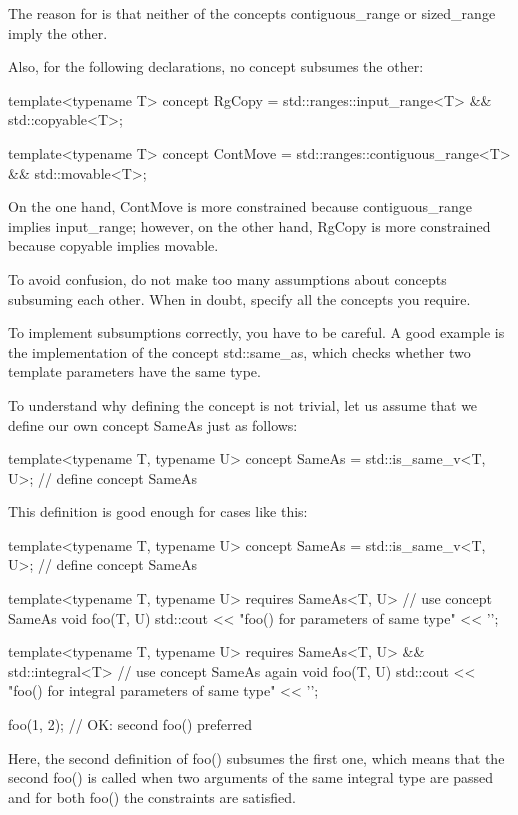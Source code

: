 The reason for is that neither of the concepts contiguous\_range or sized\_range imply the other.

Also, for the following declarations, no concept subsumes the other:

\begin{cpp}
template<typename T>
concept RgCopy = std::ranges::input_range<T> && std::copyable<T>;

template<typename T>
concept ContMove = std::ranges::contiguous_range<T> && std::movable<T>;
\end{cpp}

On the one hand, ContMove is more constrained because contiguous\_range implies input\_range; however, on the other hand, RgCopy is more constrained because copyable implies movable.

To avoid confusion, do not make too many assumptions about concepts subsuming each other. When in doubt, specify all the concepts you require.


To implement subsumptions correctly, you have to be careful. A good example is the implementation of the concept std::same\_as, which checks whether two template parameters have the same type.

To understand why defining the concept is not trivial, let us assume that we define our own concept SameAs just as follows:

\begin{cpp}
template<typename T, typename U>
concept SameAs = std::is_same_v<T, U>; // define concept SameAs
\end{cpp}

This definition is good enough for cases like this:

\begin{cpp}
template<typename T, typename U>
concept SameAs = std::is_same_v<T, U>; // define concept SameAs

template<typename T, typename U>
requires SameAs<T, U> // use concept SameAs
void foo(T, U)
{
	std::cout << "foo() for parameters of same type" << '\n';
}

template<typename T, typename U>
requires SameAs<T, U> && std::integral<T> // use concept SameAs again
void foo(T, U)
{
	std::cout << "foo() for integral parameters of same type" << '\n';
}

foo(1, 2); // OK: second foo() preferred
\end{cpp}

Here, the second definition of foo() subsumes the first one, which means that the second foo() is called when two arguments of the same integral type are passed and for both foo() the constraints are satisfied.

